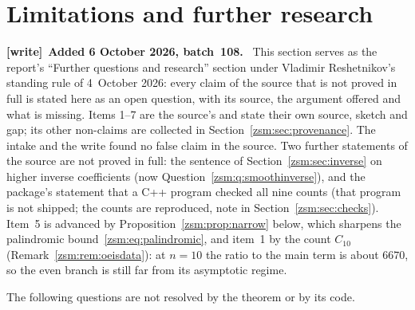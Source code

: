 \documentclass[11pt]{article}
\theoremstyle{definition}\newtheorem{definition}[theorem]{Definition}
\theoremstyle{remark}\newtheorem{remark}[theorem]{Remark}
\newenvironment{writenote}[1][]{\par\smallskip\begingroup\small
 \noindent\textbf{[write]}\if\relax\detokenize{#1}\relax\else~\textbf{#1.}\fi\ }%
 {\par\endgroup\smallskip}
\begin{document}
\section{Limitations and further research}\label{zsm:sec:limits}
\begin{writenote}[Added 6 October 2026, batch~108]
This section serves as the report's ``Further questions and research''
section under Vladimir Reshetnikov's standing rule of 4~October 2026: every
claim of the source that is not proved in full is stated here as an open
question, with its source, the argument offered and what is missing. Items
1--7 are the source's and state their own source, sketch and gap; its other
non-claims are collected in Section~\ref{zsm:sec:provenance}. The intake and
the write found no false claim in the source. Two further statements of the
source are not proved in full: the sentence of
Section~\ref{zsm:sec:inverse} on higher inverse coefficients (now
Question~\ref{zsm:q:smoothinverse}), and the package's statement that a C++
program checked all nine counts (that program is not shipped; the counts
are reproduced, note in Section~\ref{zsm:sec:checks}). Item~5 is advanced by
Proposition~\ref{zsm:prop:narrow} below, which sharpens the palindromic
bound~\eqref{zsm:eq:palindromic}, and item~1 by the count $C_{10}$
(Remark~\ref{zsm:rem:oeisdata}): at $n=10$ the ratio to the main term is
about $6670$, so the even branch is still far from its asymptotic regime.
\end{writenote}
The following questions are not resolved by the theorem or by its code.
\end{document}
